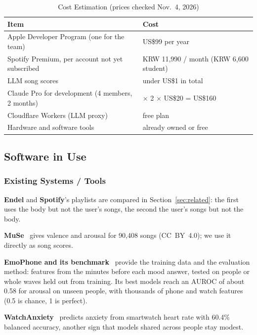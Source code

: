 \documentclass[conference]{IEEEtran}
\begin{document}
\begin{table}[H]
\centering
\caption{Cost Estimation (prices checked Nov.\ 4, 2026)}
\label{tab:cost}
\scriptsize
\begin{tabularx}{\columnwidth}{|>{\raggedright\arraybackslash}X|>{\raggedright\arraybackslash}p{3.2cm}|}
\hline
\textbf{Item} & \textbf{Cost} \\ \hline
Apple Developer Program (one for the team) & US\$99 per year \\ \hline
Spotify Premium, per account not yet subscribed & KRW 11,990 / month (KRW 6,600 student) \\ \hline
LLM song scores & under US\$1 in total \\ \hline
Claude Pro for development (4 members, 2 months) & 4 $\times$ 2 $\times$ US\$20 = US\$160 \\ \hline
Cloudflare Workers (LLM proxy) & free plan \\ \hline
Hardware and software tools & already owned or free \\ \hline
\end{tabularx}
\end{table}

\subsection{Software in Use}
\subsubsection{Existing Systems / Tools}
\textbf{Endel} and \textbf{Spotify}'s playlists are compared in Section~\ref{sec:related}: the first uses the body but not the user's songs, the second the user's songs but not the body.

\textbf{MuSe}~\cite{muse} gives valence and arousal for 90,408 songs (CC~BY~4.0); we use it directly as song scores.

\textbf{EmoPhone and its benchmark}~\cite{emophone} provide the training data and the evaluation method: features from the minutes before each mood answer, tested on people or whole waves held out from training. Its best models reach an AUROC of about 0.58 for arousal on unseen people, with thousands of phone and watch features (0.5 is chance, 1 is perfect).

\textbf{WatchAnxiety}~\cite{watchanxiety} predicts anxiety from smartwatch heart rate with 60.4\% balanced accuracy, another sign that models shared across people stay modest.
\end{document}
